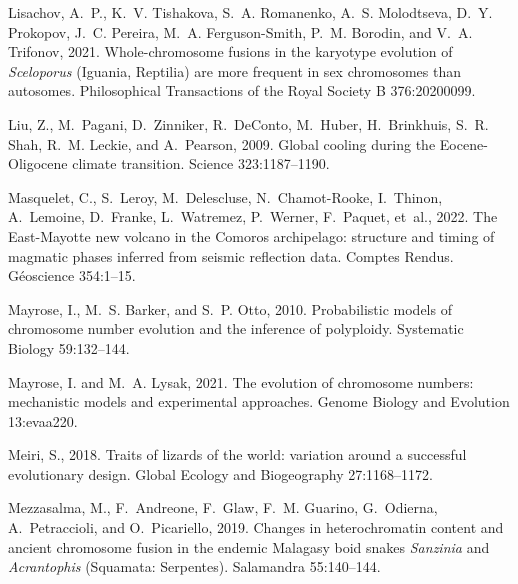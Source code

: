 \documentclass[a4paper, 12pt]{article}
\begin{document}
\begin{thebibliography}{73}
Lisachov, A.~P., K.~V. Tishakova, S.~A. Romanenko, A.~S. Molodtseva, D.~Y.
  Prokopov, J.~C. Pereira, M.~A. Ferguson-Smith, P.~M. Borodin, and V.~A.
  Trifonov, 2021.
\newblock Whole-chromosome fusions in the karyotype evolution of
  \textit{{S}celoporus} ({I}guania, {R}eptilia) are more frequent in sex
  chromosomes than autosomes.
\newblock Philosophical Transactions of the Royal Society B 376:20200099.

Liu, Z., M.~Pagani, D.~Zinniker, R.~DeConto, M.~Huber, H.~Brinkhuis, S.~R.
  Shah, R.~M. Leckie, and A.~Pearson, 2009.
\newblock Global cooling during the {E}ocene-{O}ligocene climate transition.
\newblock Science 323:1187--1190.

Masquelet, C., S.~Leroy, M.~Delescluse, N.~Chamot-Rooke, I.~Thinon, A.~Lemoine,
  D.~Franke, L.~Watremez, P.~Werner, F.~Paquet, et~al., 2022.
\newblock The {E}ast-{M}ayotte new volcano in the {C}omoros archipelago:
  structure and timing of magmatic phases inferred from seismic reflection
  data.
\newblock Comptes Rendus. G{\'e}oscience 354:1--15.

Mayrose, I., M.~S. Barker, and S.~P. Otto, 2010.
\newblock Probabilistic models of chromosome number evolution and the inference
  of polyploidy.
\newblock Systematic Biology 59:132--144.

Mayrose, I. and M.~A. Lysak, 2021.
\newblock The evolution of chromosome numbers: mechanistic models and
  experimental approaches.
\newblock Genome Biology and Evolution 13:evaa220.

Meiri, S., 2018.
\newblock Traits of lizards of the world: variation around a successful
  evolutionary design.
\newblock Global Ecology and Biogeography 27:1168--1172.

Mezzasalma, M., F.~Andreone, F.~Glaw, F.~M. Guarino, G.~Odierna,
  A.~Petraccioli, and O.~Picariello, 2019.
\newblock Changes in heterochromatin content and ancient chromosome fusion in
  the endemic {M}alagasy boid snakes \textit{Sanzinia} and \textit{Acrantophis}
  ({S}quamata: {S}erpentes).
\newblock Salamandra 55:140--144.


\end{thebibliography}
\end{document}

